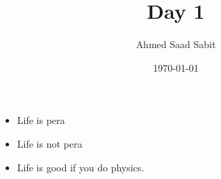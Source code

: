 \documentclass[11pt]{beamer}
\title{Day 1}
\author{Ahmed Saad Sabit}
\date{\today}
\begin{document}
    \begin{frame}
        \titlepage      
    \end{frame}

    \begin{frame}
        \begin{itemize}
            \item Life is pera \pause
            \item Life is not pera \pause 
            \item Life is {\color{probC}good} if you do physics.
        \end{itemize}
\end{frame}
\end{document}
